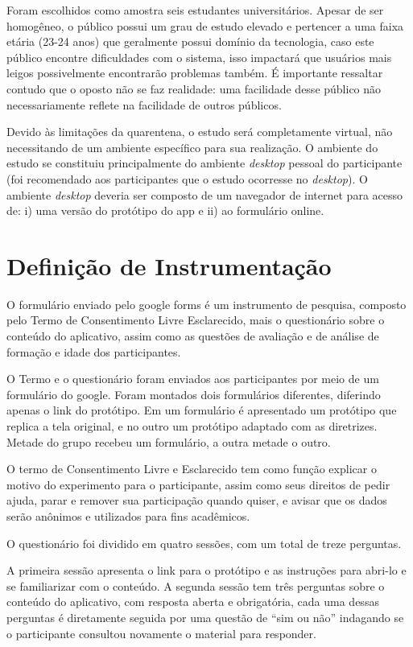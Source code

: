 \documentclass[12pt]{article}
\begin{document}
Foram escolhidos como amostra seis estudantes universitários. Apesar de ser homogêneo, o público possui um grau de estudo elevado e pertencer a uma faixa etária (23-24 anos) que geralmente possui domínio da tecnologia, caso este público encontre dificuldades com o sistema, isso impactará que usuários mais leigos possivelmente encontrarão problemas também. É importante ressaltar contudo que o oposto não se faz realidade: uma facilidade desse público não necessariamente reflete na facilidade de outros públicos.

Devido às limitações da quarentena, o estudo será completamente virtual, não necessitando de um ambiente específico para sua realização. O ambiente do estudo se constituiu principalmente do ambiente \textit{desktop} pessoal do participante (foi recomendado aos participantes que o estudo ocorresse no \textit{desktop}). O ambiente \textit{desktop} deveria ser composto de um navegador de internet para acesso de: i) uma versão do protótipo do app e ii) ao formulário online.

\section{Definição de Instrumentação}

O formulário enviado pelo google forms é um instrumento de pesquisa, composto pelo Termo de Consentimento Livre Esclarecido, mais o questionário sobre o conteúdo do aplicativo, assim como as questões de avaliação e de análise de formação e idade dos participantes.

O Termo e o questionário foram enviados aos participantes por meio de um formulário do google. Foram montados dois formulários diferentes, diferindo apenas o link do protótipo. Em um formulário é apresentado um protótipo que replica a tela original, e no outro um protótipo adaptado com as diretrizes. Metade do grupo recebeu um formulário, a outra metade o outro.

O termo de Consentimento Livre e Esclarecido tem como função explicar o motivo do experimento para o participante, assim como seus direitos de pedir ajuda, parar e remover sua participação quando quiser, e avisar que os dados serão anônimos e utilizados para fins acadêmicos.

O questionário foi dividido em quatro sessões, com um total de treze perguntas.

A primeira sessão apresenta o link para o protótipo e as instruções para abri-lo e se familiarizar com o conteúdo. A segunda sessão tem três perguntas sobre o conteúdo do aplicativo, com resposta aberta e obrigatória, cada uma dessas perguntas é diretamente seguida por uma questão de ``sim ou não'' indagando se o participante consultou novamente o material para responder. 
\end{document}
